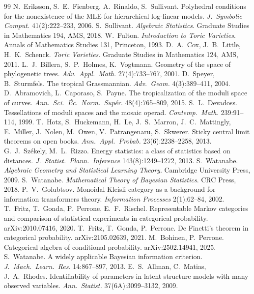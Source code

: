 \documentclass[11pt]{article}
\theoremstyle{definition}
\theoremstyle{remark}
\begin{document}
\begin{thebibliography}{99}
 N.~Eriksson, S.~E.~Fienberg, A.~Rinaldo, S.~Sullivant. Polyhedral conditions for the nonexistence of the MLE for hierarchical log-linear models. \emph{J.\ Symbolic Comput.} 41(2):222--233, 2006.
 S.~Sullivant. \emph{Algebraic Statistics}. Graduate Studies in Mathematics 194, AMS, 2018.
 W.~Fulton. \emph{Introduction to Toric Varieties}. Annals of Mathematics Studies 131, Princeton, 1993.
 D.~A.~Cox, J.~B.~Little, H.~K.~Schenck. \emph{Toric Varieties}. Graduate Studies in Mathematics 124, AMS, 2011.
 L.~J.~Billera, S.~P.~Holmes, K.~Vogtmann. Geometry of the space of phylogenetic trees. \emph{Adv.\ Appl.\ Math.} 27(4):733--767, 2001.
 D.~Speyer, B.~Sturmfels. The tropical Grassmannian. \emph{Adv.\ Geom.} 4(3):389--411, 2004.
 D.~Abramovich, L.~Caporaso, S.~Payne. The tropicalization of the moduli space of curves. \emph{Ann.\ Sci.\ \'Ec.\ Norm.\ Sup\'er.} 48(4):765--809, 2015.
 S.~L.~Devadoss. Tessellations of moduli spaces and the mosaic operad. \emph{Contemp.\ Math.} 239:91--114, 1999.
 T.~Hotz, S.~Huckemann, H.~Le, J.~S.~Marron, J.~C.~Mattingly, E.~Miller, J.~Nolen, M.~Owen, V.~Patrangenaru, S.~Skwerer. Sticky central limit theorems on open books. \emph{Ann.\ Appl.\ Probab.} 23(6):2238--2258, 2013.
 G.~J.~Sz\'ekely, M.~L.~Rizzo. Energy statistics: a class of statistics based on distances. \emph{J.\ Statist.\ Plann.\ Inference} 143(8):1249--1272, 2013.
 S.~Watanabe. \emph{Algebraic Geometry and Statistical Learning Theory}. Cambridge University Press, 2009.
 S.~Watanabe. \emph{Mathematical Theory of Bayesian Statistics}. CRC Press, 2018.
 P.~V.~Golubtsov. Monoidal Kleisli category as a background for information transformers theory. \emph{Information Processes} 2(1):62--84, 2002.
 T.~Fritz, T.~Gonda, P.~Perrone, E.~F.~Rischel. Representable Markov categories and comparison of statistical experiments in categorical probability. arXiv:2010.07416, 2020.
 T.~Fritz, T.~Gonda, P.~Perrone. De Finetti's theorem in categorical probability. arXiv:2105.02639, 2021.
 M.~Bohinen, P.~Perrone. Categorical algebra of conditional probability. arXiv:2502.14941, 2025.
 S.~Watanabe. A widely applicable Bayesian information criterion. \emph{J.\ Mach.\ Learn.\ Res.} 14:867--897, 2013.
 E.~S.~Allman, C.~Matias, J.~A.~Rhodes. Identifiability of parameters in latent structure models with many observed variables. \emph{Ann.\ Statist.} 37(6A):3099--3132, 2009.

\end{thebibliography}
\end{document}

